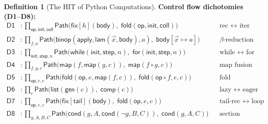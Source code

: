 \documentclass[11pt,a4paper]{report}
\theoremstyle{definition}
\newtheorem{definition}{Definition}[chapter]
\theoremstyle{plain}
\newcommand{\Path}{\mathsf{Path}}
\newcommand{\fold}{\mathsf{fold}}
\begin{document}
\begin{definition}[The HIT of Python Computations]
\smallskip
\noindent\textbf{Control flow dichotomies (D1--D8):}
\begin{align}
  \mathsf{D1} &: \prod_{\mathsf{op},\mathsf{init},\mathsf{coll}}
    \Path\bigl(\mathsf{fix}[h](\mathsf{body}),\;
    \fold(\mathsf{op}, \mathsf{init}, \mathsf{coll})\bigr)
    & &\text{rec $\leftrightarrow$ iter} \\
  \mathsf{D2} &: \prod_{f, a}
    \Path\bigl(\mathsf{binop}(\mathsf{apply}, \mathsf{lam}(\vec{x}, \mathsf{body}), a),\;
    \mathsf{body}[\vec{x} \mapsto a]\bigr)
    & &\text{$\beta$-reduction} \\
  \mathsf{D3} &: \prod_{\mathsf{init}, \mathsf{step}, n}
    \Path\bigl(\mathsf{while}(\mathsf{init}, \mathsf{step}, n),\;
    \mathsf{for}(\mathsf{init}, \mathsf{step}, n)\bigr)
    & &\text{while $\leftrightarrow$ for} \\
  \mathsf{D4} &: \prod_{f, g, c}
    \Path\bigl(\mathsf{map}(f, \mathsf{map}(g, c)),\;
    \mathsf{map}(f \circ g, c)\bigr)
    & &\text{map fusion} \\
  \mathsf{D5} &: \prod_{\mathsf{op}, e, c}
    \Path\bigl(\fold(\mathsf{op}, e, \mathsf{map}(f, c)),\;
    \fold(\mathsf{op} \circ f, e, c)\bigr)
    & &\text{fold universality} \\
  \mathsf{D6} &: \prod_{c}
    \Path\bigl(\mathsf{list}(\mathsf{gen}(c)),\; \mathsf{comp}(c)\bigr)
    & &\text{lazy $\leftrightarrow$ eager} \\
  \mathsf{D7} &: \prod_{\mathsf{op}, e, c}
    \Path\bigl(\mathsf{fix}[\mathsf{tail}](\mathsf{body}),\;
    \fold(\mathsf{op}, e, c)\bigr)
    & &\text{tail-rec $\leftrightarrow$ loop} \\
  \mathsf{D8} &: \prod_{g, A, B, C}
    \Path\bigl(\mathsf{cond}(g, A, \mathsf{cond}(\neg g, B, C)),\;
    \mathsf{cond}(g, A, C)\bigr)
    & &\text{section merge}
\end{align}


\end{definition}
\end{document}
